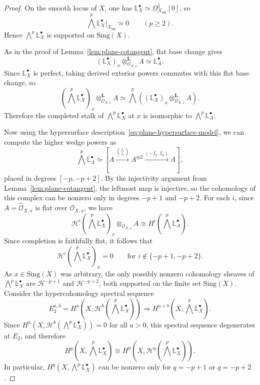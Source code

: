 \documentclass[12pt,reqno]{amsart}
\begin{document}
\begin{proof}
On the smooth locus of \(X\), one has \(\mathbb{L}^{\bullet}_X\simeq \Omega_{X_{\mathrm{sm}}}^1[0]\), so
\[
\bigwedge^p\mathbb{L}^{\bullet}_X\big|_{X_{\mathrm{sm}}}\simeq 0
\qquad (p\ge 2).
\]
Hence \(\bigwedge^p\mathbb{L}^{\bullet}_X\) is supported on \(\mathrm{Sing}(X)\).

As in the proof of Lemma~\ref{lem:plane-cotangent}, flat base change gives
\[
(\mathbb{L}^{\bullet}_X)_x\otimes_{\mathcal O_{X,x}}^{\mathbf L} A \simeq \mathbb{L}^{\bullet}_A.
\]
Since \(\mathbb{L}^{\bullet}_X\) is perfect, taking derived exterior powers commutes with this flat base change, so
\[
\left(\bigwedge^p\mathbb{L}^{\bullet}_X\right)_x\otimes_{\mathcal O_{X,x}}^{\mathbf L} A
\simeq
\bigwedge^p\!\left((\mathbb{L}^{\bullet}_X)_x\otimes_{\mathcal O_{X,x}}^{\mathbf L} A\right).
\]
Therefore the completed stalk of \(\bigwedge^p\mathbb{L}^{\bullet}_X\) at \(x\) is isomorphic to \(\bigwedge^p\mathbb{L}^{\bullet}_A\).

Now using the hypersurface description~\eqref{eq:plane-hypersurface-model}, we can compute the higher wedge powers as 
\[
\bigwedge^p\mathbb{L}^{\bullet}_A \simeq
\left[
A \xrightarrow{\binom{f_u}{f_v}} A^{\oplus 2}
\xrightarrow{(-f_v\ \ f_u)} A
\right],
\]
placed in degrees \([-p,-p+2]\). By the injectivity argument from Lemma~\ref{lem:plane-cotangent}, the leftmost map is injective, so the cohomology of this complex can be nonzero only in degrees \(-p+1\) and \(-p+2\).
For each \(i\), since \(A=\widehat{\mathcal O}_{X,x}\) is flat over \(\mathcal O_{X,x}\), we have
\[
\mathcal H^i\!\left(\bigwedge^p\mathbb{L}^{\bullet}_X\right)_x\otimes_{\mathcal O_{X,x}} A
\cong
H^i\!\left(\bigwedge^p\mathbb{L}^{\bullet}_A\right).
\]
Since completion is faithfully flat, it follows that
\[
\mathcal H^i\!\left(\bigwedge^p\mathbb{L}^{\bullet}_X\right)_x=0
\qquad\text{for } i\notin\{-p+1,-p+2\}.
\]
As \(x\in \mathrm{Sing}(X)\) was arbitrary, the only possibly nonzero cohomology sheaves of \(\bigwedge^p\mathbb{L}^{\bullet}_X\) are \(\mathcal H^{-p+1}\) and \(\mathcal H^{-p+2}\), both supported on the finite set \(\mathrm{Sing}(X)\). Consider the hypercohomology spectral sequence
\[
E_2^{a,b}=H^a\!\left(X,\mathcal H^b\!\left(\bigwedge^p\mathbb{L}^{\bullet}_X\right)\right)
\Longrightarrow
H^{a+b}\!\left(X,\bigwedge^p\mathbb{L}^{\bullet}_X\right).
\]
Since \(H^a(X,\mathcal H^b(\bigwedge^p\mathbb{L}^{\bullet}_X))=0\) for all \(a>0\), this spectral sequence degenerates at \(E_2\), and therefore
\[
H^q\!\left(X,\bigwedge^p\mathbb{L}^{\bullet}_X\right)
\cong
H^0\!\left(X,\mathcal H^q\!\left(\bigwedge^p\mathbb{L}^{\bullet}_X\right)\right).
\]
In particular, \(H^q(X,\bigwedge^p\mathbb{L}^{\bullet}_X)\) can be nonzero only for \(q=-p+1\) or \(q=-p+2\).
\end{proof}
\end{document}
